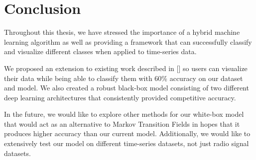 \documentclass{turabian-thesis}
\begin{document}


\chapter{Conclusion}
\label{chap:conclusion}
Throughout this thesis, we have stressed the importance of a hybrid machine learning algorithm as well as providing a framework that can successfully classify and visualize different classes when applied to time-series data. 

We proposed an extension to existing work described in [] so users can visualize their data while being able to classify them with 60\% accuracy on our dataset and model. We also created a robust black-box model consisting of two different deep learning architectures that consistently provided competitive accuracy.

In the future, we would like to explore other methods for our white-box model that would act as an alternative to Markov Transition Fields in hopes that it produces higher accuracy than our current model. Additionally, we would like to extensively test our model on different time-series datasets, not just radio signal datasets.



 
\end{document}
